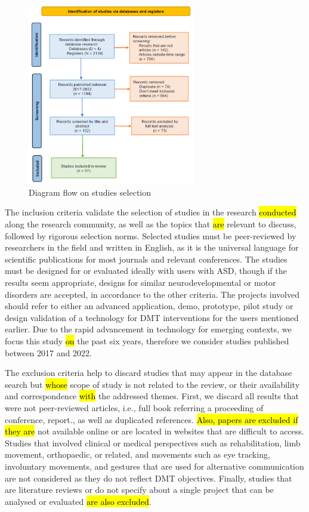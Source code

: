 \documentclass[a4paper,fleqn]{cas-sc}
\begin{document}
\begin{figure}
	\includegraphics[width=0.65\textwidth]{fig1_search_flow.png}
        \centering
	  \caption{Diagram flow on studies selection}\label{fig1}
        \label{fig:studies-flow}
\end{figure}


The inclusion criteria validate the selection of studies in the research \hl{conducted} along the research community, as well as the topics that \hl{are} relevant to discuss, followed by rigorous selection norms. Selected studies must be peer-reviewed by researchers in the field and written in English, as it is the universal language for scientific publications for most journals and relevant conferences. The studies must be designed for or evaluated ideally with users with ASD, though if the results seem appropriate, designs for similar neurodevelopmental or motor disorders are accepted, in accordance to the other criteria. The projects involved should refer to either an advanced application, demo, prototype, pilot study or design validation of a technology for DMT interventions for the users mentioned earlier. Due to the rapid advancement in technology for emerging contexts, we focus this study \hl{on} the past six years, therefore we consider studies published between 2017 and 2022.


The exclusion criteria help to discard studies that may appear in the database search but \hl{whose} scope of study is not related to the review, or their availability and correspondence \hl{with} the addressed themes. First, we discard all results that were not peer-reviewed articles, i.e., full book referring a proceeding of conference, report., as well as duplicated references. \hl{Also, papers are excluded if they are } not available online or are located in websites that are difficult to access. Studies that involved clinical or medical perspectives such as rehabilitation, limb movement, orthopaedic, or related, and movements such as eye tracking, involuntary movements, and gestures that are used for alternative communication are not considered as they do not reflect DMT objectives. Finally, studies that are literature reviews or do not specify about a single project that can be analysed or evaluated \hl{are also excluded}.
\end{document}
